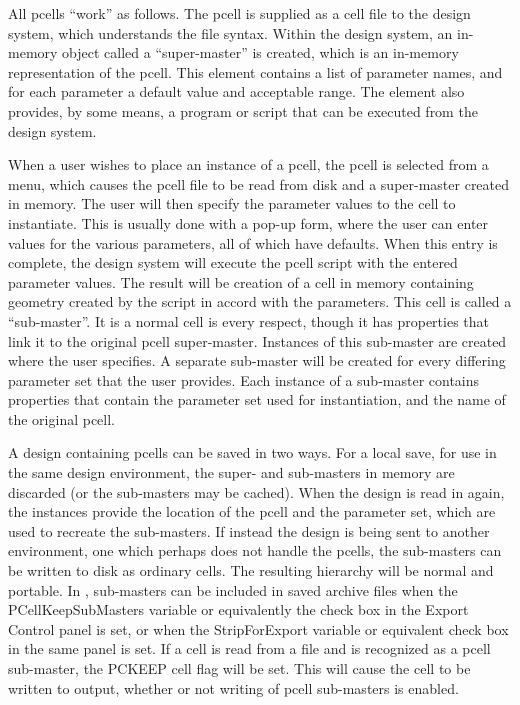 All pcells ``work'' as follows.  The pcell is supplied as a cell file
to the design system, which understands the file syntax.  Within the
design system, an in-memory object called a ``super-master'' is
created, which is an in-memory representation of the pcell.  This
element contains a list of parameter names, and for each parameter a
default value and acceptable range.  The element also provides, by
some means, a program or script that can be executed from the design
system.

When a user wishes to place an instance of a pcell, the pcell is
selected from a menu, which causes the pcell file to be read from disk
and a super-master created in memory.  The user will then specify the
parameter values to the cell to instantiate.  This is usually done
with a pop-up form, where the user can enter values for the various
parameters, all of which have defaults.  When this entry is complete,
the design system will execute the pcell script with the entered
parameter values.  The result will be creation of a cell in memory
containing geometry created by the script in accord with the
parameters.  This cell is called a ``sub-master''.  It is a normal
cell is every respect, though it has properties that link it to the
original pcell super-master.  Instances of this sub-master are created
where the user specifies.  A separate sub-master will be created for
every differing parameter set that the user provides.  Each instance
of a sub-master contains properties that contain the parameter set
used for instantiation, and the name of the original pcell.

A design containing pcells can be saved in two ways.  For a local
save, for use in the same design environment, the super- and
sub-masters in memory are discarded (or the sub-masters may be
cached).  When the design is read in again, the instances provide the
location of the pcell and the parameter set, which are used to
recreate the sub-masters.  If instead the design is being sent to
another environment, one which perhaps does not handle the pcells, the
sub-masters can be written to disk as ordinary cells.  The resulting
hierarchy will be normal and portable.  In {\Xic}, sub-masters can be
included in saved archive files when the {\cb PCellKeepSubMasters}
variable or equivalently the check box in the {\cb Export Control}
panel is set, or when the {\et StripForExport} variable or equivalent
check box in the same panel is set.  If a cell is read from a file and
is recognized as a pcell sub-master, the PCKEEP cell flag will be set. 
This will cause the cell to be written to output, whether or not
writing of pcell sub-masters is enabled.

